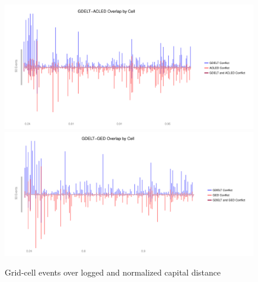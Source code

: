 \documentclass[hidelinks]{article}
\begin{document}
\begin{figure}[!htbp]
\includegraphics[width = 1 \textwidth]{spaceACLEDAppendixD4sources.pdf}\\
\includegraphics[width = 1 \textwidth]{spaceGEDAppendixD4sources.pdf}
\caption{Grid-cell events over logged and normalized capital distance}\label{fig:correlations_space}
\end{figure}
\newpage
\end{document}
